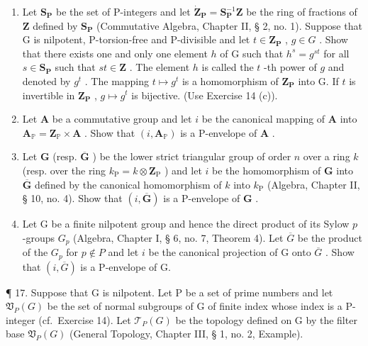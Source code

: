 \begin{enumerate}
\def\labelenumi{(\alph{enumi})}
\item
  Let \(\mathbf{S}_{\mathbf{P}}\) be the set of P-integers and let \(\mathbf{\dot{Z}}_{\mathbf{P}} = \mathbf{S}_{\mathbf{P}}^{-1}\mathbf{Z}\) be the ring of fractions of \(\mathbf{Z}\) defined by \(\mathbf{S}_{\mathbf{P}}\) (Commutative Algebra, Chapter II, § 2, no. 1). Suppose that G is nilpotent, P-torsion-free and P-divisible and let \(t \in \mathbf{Z}_{\mathbf{P}}\) , \(g \in G\) . Show that there exists one and only one element \(h\) of G such that \(h^s = g^{st}\) for all \(s \in \mathbf{S}_{\mathbf{P}}\) such that \(st \in \mathbf{Z}\) . The element \(h\) is called the \(t\) -th power of \(g\) and denoted by \(g^t\) . The mapping \(t \mapsto g^t\) is a homomorphism of \(\mathbf{Z}_{\mathbf{P}}\) into G. If \(t\) is invertible in \(\mathbf{Z}_{\mathbf{P}}\) , \(g \mapsto g^t\) is bijective. (Use Exercise 14 (c)).
\item
  Let \(\mathbf{A}\) be a commutative group and let \(i\) be the canonical mapping of \(\mathbf{A}\) into \(\mathbf{A}_{\mathbb{P}} = \mathbf{Z}_{\mathbb{P}} \times \mathbf{A}\) . Show that \((i, \mathbf{A}_{\mathbb{P}})\) is a P-envelope of \(\mathbf{A}\) .
\item
  Let \(\mathbf{G}\) (resp. \(\overline{\mathbf{G}}\) ) be the lower strict triangular group of order \(n\) over a ring \(k\) (resp. over the ring \(k_{\mathrm{P}} = k\otimes \mathbf{Z}_{\mathrm{P}}\) ) and let \(i\) be the homomorphism of \(\mathbf{G}\) into \(\overline{\mathbf{G}}\) defined by the canonical homomorphism of \(k\) into \(k_{\mathrm{P}}\) (Algebra, Chapter II, § 10, no. 4). Show that \((i,\overline{\mathbf{G}})\) is a P-envelope of \(\mathbf{G}\) .
\item
  Let G be a finite nilpotent group and hence the direct product of its Sylow \(p\) -groups \(G_p\) (Algebra, Chapter I, § 6, no. 7, Theorem 4). Let \(\overline{G}\) be the product of the \(G_p\) for \(p \notin P\) and let \(i\) be the canonical projection of G onto \(\overline{G}\) . Show that \((i, \overline{G})\) is a P-envelope of G.
\end{enumerate}

¶ 17. Suppose that G is nilpotent. Let P be a set of prime numbers and let \(\mathfrak{V}_{P}(G)\) be the set of normal subgroups of G of finite index whose index is a P-integer (cf.~Exercise 14). Let \(\mathcal{T}_{P}(G)\) be the topology defined on G by the filter base \(\mathfrak{V}_{P}(G)\) (General Topology, Chapter III, § 1, no. 2, Example).

